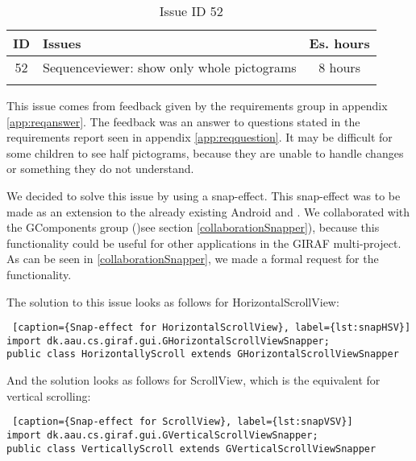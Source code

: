 \begin{longtable} { | c | p{12cm} | c | } 
\hline
	ID 	&	Issues	&		 Es. hours \\\hline
	52 	&	Sequenceviewer: show only whole pictograms	&	8 hours \\\hline
\caption{Issue ID 52}
\label{tab:spr3_SVnohalfpictograms}
\end{longtable}

This issue comes from feedback given by the requirements group in appendix \ref{app:reqanswer}. The feedback was an answer to questions stated in the requirements report seen in appendix \ref{app:reqquestion}. It may be difficult for some children to see half pictograms, because they are unable to handle changes or something they do not understand. 

We decided to solve this issue by using a snap-effect. This snap-effect was to be made as an extension to the already existing Android  and . We collaborated with the GComponents group ()see section \ref{collaborationSnapper}), because this functionality could be useful for other applications in the GIRAF multi-project. As can be seen in \ref{collaborationSnapper}, we made a formal request for the functionality.

The solution to this issue looks as follows for HorizontalScrollView:
\begin{lstlisting} [caption={Snap-effect for HorizontalScrollView}, label={lst:snapHSV}]
import dk.aau.cs.giraf.gui.GHorizontalScrollViewSnapper;
public class HorizontallyScroll extends GHorizontalScrollViewSnapper
\end{lstlisting}

And the solution looks as follows for ScrollView, which is the equivalent for vertical scrolling:
\begin{lstlisting} [caption={Snap-effect for ScrollView}, label={lst:snapVSV}]
import dk.aau.cs.giraf.gui.GVerticalScrollViewSnapper;
public class VerticallyScroll extends GVerticalScrollViewSnapper
\end{lstlisting}